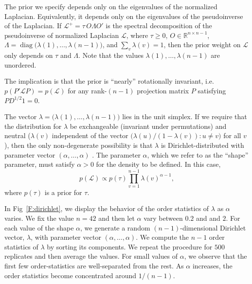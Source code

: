 \documentclass[12pt]{article}
\newcommand{\reals}{\mathbb{R}}
\DeclareMathOperator*{\diag}{diag}
\theoremstyle{plain}
\begin{document}
The prior we specify depends only on the eigenvalues of the normalized
Laplacian.  Equivalently, it depends only on the eigenvalues of the pseudoinverse of
the Laplacian.  If $\mathcal{L}^+ = \tau \, O \Lambda O'$ is the spectral
decomposition of the pseudoinverse of normalized Laplacian
$\mathcal{L}$, where $\tau \geq 0$,
$O \in \reals^{n \times n -1}$, 
$\Lambda = \diag\big(\lambda(1), \dotsc, \lambda({n-1})\big)$, and
$\sum_v \lambda(v) = 1$,  then the prior
weight on $\mathcal{L}$ only depends on $\tau$ and $\Lambda$.  Note that the
values $\lambda(1), \dotsc, \lambda(n-1)$ are unordered.

The implication is that the prior is ``nearly'' rotationally
invariant, i.e. $p(P' \mathcal{L} P) = p(\mathcal{L})$ for any rank-$(n-1)$
projection matrix $P$ satisfying $P D^{1/2} 1 = 0$.

The vector $\lambda = \big(\lambda(1), \dotsc, \lambda(n-1)\big)$ lies
in the unit simplex.  If we require that the
distribution for $\lambda$ be exchangeable (invariant under
permutations) and neutral ($\lambda(v)$ independent of the vector
$\big(\lambda(u) / (1 - \lambda(v)) : u \neq v\big)$ for all $v$),
then the only non-degenerate possibility is that $\lambda$ is
Dirichlet-distributed with parameter vector $(\alpha, \ldots, \alpha)$
\cite{fabius1973two}.  The parameter $\alpha$, which we refer to as
the ``shape'' parameter, must satisfy $\alpha > 0$ for the density to
be defined.  In this case,
\begin{equation}\label{E:dirichlet-prior}
  p(\mathcal{L})
   \propto p(\tau) \prod_{v=1}^{n-1} \lambda(v)^{\alpha - 1},
\end{equation}
where $p(\tau)$ is a prior for $\tau$.

In Fig~\ref{F:dirichlet}, we display the behavior of the order
statistics of $\lambda$ as $\alpha$ varies.  We fix the value $n = 42$
and then let $\alpha$ vary between $0.2$ and and $2$.  For each value
of the shape $\alpha$, we generate a random $(n-1)$-dimensional Dirichlet
vector, $\lambda$, with parameter vector $(\alpha, \dotsc, \alpha)$.
We compute the $n-1$ order statistics of $\lambda$ by sorting its
components.  We repeat the procedure for $500$ replicates and then
average the values.  For small values of $\alpha$, we observe that the
first few order-statistics are well-separated from the rest.  As
$\alpha$ increases, the order statistics become concentrated
around $1/(n-1)$.
\end{document}
